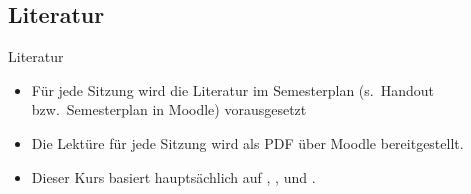 %
\subsection{Literatur}

\begin{frame}{Literatur}

\begin{itemize}
	\item Für jede Sitzung wird die Literatur im Semesterplan (s.\ Handout bzw.\ Semesterplan in Moodle) vorausgesetzt
	\item Die Lektüre für jede Sitzung wird als PDF über Moodle bereitgestellt.
\bigskip

	\item Dieser Kurs basiert hauptsächlich auf , ,  und \citet{Abramowski2016a}.
\end{itemize}		

\end{frame}

